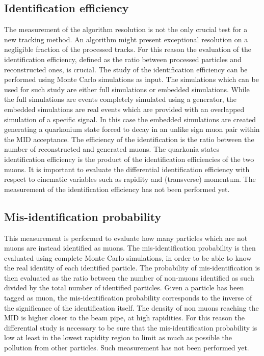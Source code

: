 \subsection{Identification efficiency}
The measurement of the algorithm resolution is not the only crucial test for a new tracking method.
An algorithm might present exceptional resolution on a negligible fraction of the processed tracks.
For this reason the evaluation of the identification efficiency, defined as the ratio between processed particles and reconstructed ones, is crucial.
The study of the identification efficiency can be performed using Monte Carlo simulations as input.
The simulations which can be used for such study are either full simulations or embedded simulations.
While the full simulations are events completely simulated using a generator, the embedded simulations are real events which are provided with an overlapped simulation of a specific signal.
In this case the embedded simulations are created generating a quarkonium state forced to decay in an unlike sign muon pair within the MID acceptance.
The efficiency of the identification is the ratio between the number of reconstructed and generated muons.
The quarkonia states identification efficiency is the product of the identification efficiencies of the two muons.
It is important to evaluate the differential identification efficiency with respect to cinematic variables such as rapidity and (transverse) momentum.
The measurement of the identification efficiency has not been performed yet.

\subsection{Mis-identification probability}
This measurement is performed to evaluate how many particles which are not muons are instead identified as muons.
The mis-identification probability is then evaluated using complete Monte Carlo simulations, in order to be able to know the real identity of each identified particle.
The probability of mis-identification is then evaluated as the ratio between the number of non-muons identified as such divided by the total number of identified particles.
Given a particle has been tagged as muon, the mis-identification probability corresponds to the inverse of the significance of the identification itself.
The density of non muons reaching the MID is higher closer to the beam pipe, at high rapidities.
For this reason the differential study is necessary to be sure that the mis-identification probability is low at least in the lowest rapidity region to limit as much as possible the pollution from other particles.
Such measurement has not been performed yet.